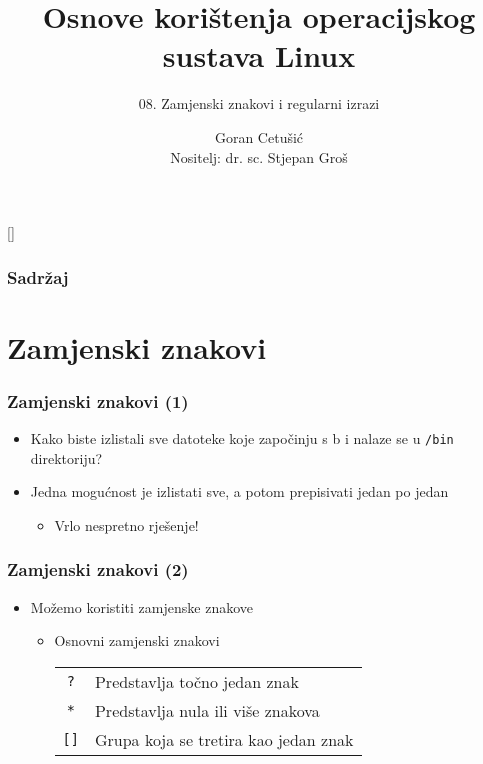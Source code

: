 \documentclass[table,usenames,dvipsnames]{beamer}
\title{Osnove korištenja operacijskog sustava Linux}
\subtitle{08. Zamjenski znakovi i regularni izrazi}
\author[Goran Cetušić]{Goran Cetušić\\{\small Nositelj: dr. sc. Stjepan Groš}}
\institute[FER]{Sveučilište u Zagrebu \\
				Fakultet elektrotehnike i računarstva}
\date{\todayiso}
\newcommand{\shell}[1]{\texttt{#1}}
\begin{document}
{
[] %

\begin{frame}
\maketitle
\end{frame}
}

\begin{frame}
\frametitle{Sadržaj}
\tableofcontents
\end{frame}

\section{Zamjenski znakovi}
\begin{frame}[t]
\frametitle{Zamjenski znakovi (1)}
\begin{itemize}
  \item Kako biste izlistali sve datoteke koje započinju s b i nalaze se u
        \shell{/bin} direktoriju?
  \item Jedna mogućnost je izlistati sve, a potom prepisivati jedan po 
        jedan
  \begin{itemize}
    \item Vrlo nespretno rješenje!
  \end{itemize}
\end{itemize}
\end{frame}

\begin{frame}[t]
\frametitle{Zamjenski znakovi (2)}
\begin{itemize}
  \item Možemo koristiti zamjenske znakove
  \begin{itemize}
    \item Osnovni zamjenski znakovi
    \begin{tabular}{c l}
      \shell{?}   & Predstavlja točno jedan znak \\
      \shell{*}   & Predstavlja nula ili više znakova       \\
      \shell{[]}  & Grupa koja se tretira kao jedan znak
    \end{tabular}
  \end{itemize}
\end{itemize}
\end{frame}
\end{document}
